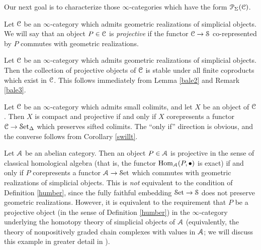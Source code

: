 Our next goal is to characterize those $\infty$-categories which have the form $\operatorname{\mathcal{P}}_{\Sigma}(\operatorname{\mathcal{C}})$.

\begin{definition}\label{humber}
Let $\operatorname{\mathcal{C}}$ be an $\infty$-category which admits geometric realizations of simplicial objects. We will say that an object $P \in \operatorname{\mathcal{C}}$ is {\it projective} if the functor $\operatorname{\mathcal{C}} \rightarrow \operatorname{\mathcal{S}}$ co-represented by $P$ commutes with geometric realizations.
\end{definition}

\begin{remark}\label{untine}
Let $\operatorname{\mathcal{C}}$ be an $\infty$-category which admits geometric realizations of simplicial objects. Then
the collection of projective objects of $\operatorname{\mathcal{C}}$ is stable under all finite coproducts which exist in $\operatorname{\mathcal{C}}$.
This follows immediately from Lemma \ref{bale2} and Remark \ref{bale3}. 
\end{remark}

\begin{remark}\label{comproj}
Let $\operatorname{\mathcal{C}}$ be an $\infty$-category which admits small colimits, and let $X$ be an object of
$\operatorname{\mathcal{C}}$. Then $X$ is compact and projective if and only if $X$ corepresents a functor
$\operatorname{\mathcal{C}} \rightarrow \operatorname{\mathcal{S}et_{\Delta}}$ which preserves sifted colimits. The ``only if'' direction is obvious, and
the converse follows from Corollary \ref{swillt}. 
\end{remark}

\begin{example}
Let $\operatorname{\mathcal{A}}$ be an abelian category. Then an object $P \in \operatorname{\mathcal{A}}$ is projective in the sense of classical homological algebra (that is, the functor $\operatorname{Hom}_{\operatorname{\mathcal{A}}}(P, \bullet)$ is exact) if and only if $P$ corepresents a functor $\operatorname{\mathcal{A}} \rightarrow \operatorname{\mathcal{S}et}$ which commutes with geometric realizations of simplicial objects. This is {\em not} equivalent to the condition of Definition \ref{humber}, since the fully faithful embedding $\operatorname{\mathcal{S}et} \rightarrow \operatorname{\mathcal{S}}$ does not preserve geometric realizations. However, it is equivalent to the requirement that $P$ be a projective object (in the sense of Definition \ref{humber}) in the $\infty$-category underlying the homotopy theory of simplicial objects
of $\operatorname{\mathcal{A}}$ (equivalently, the theory of nonpositively graded chain complexes with values in $\operatorname{\mathcal{A}}$;
we will discuss this example in greater detail in \cite{DAG}).
\end{example}

